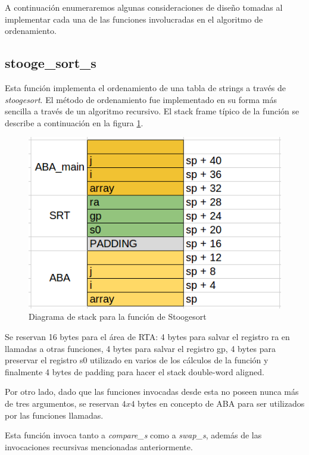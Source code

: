 \documentclass[a4paper,11pt]{article}
\begin{document}
A continuación enumeraremos algunas consideraciones de diseño tomadas al
implementar cada una de las funciones involucradas en el algoritmo de
ordenamiento.

\subsection{stooge\_sort\_s}

Esta función implementa el ordenamiento de una tabla de strings a través de
\textit{stoogesort}. El método de ordenamiento fue implementado en su forma más
sencilla a través de un algoritmo recursivo. El stack frame típico de la
función se describe a continuación en la figura \ref{fig:stackstooge}.

\begin{figure}[h!]
  \centering
  \includegraphics[width=\textwidth]{docs/stoogesort_diagrama.png}
  \caption{Diagrama de stack para la función de Stoogesort} \label{fig:stackstooge}
\end{figure}

\FloatBarrier

Se reservan 16 bytes para el área de RTA: 4 bytes para salvar el registro ra en
llamadas a otras funciones, 4 bytes para salvar el registro gp, 4 bytes para
preservar el registro s0 utilizado en varios de los cálculos de la función y
finalmente 4 bytes de padding para hacer el stack double-word aligned.

Por otro lado, dado que las funciones invocadas desde esta no poseen nunca más
de tres argumentos, se reservan \(4 x 4\) bytes en concepto de ABA para ser
utilizados por las funciones llamadas.

Esta función invoca tanto a \textit{compare\_s} como a \textit{swap\_s}, además
de las invocaciones recursivas mencionadas anteriormente.
\end{document}

